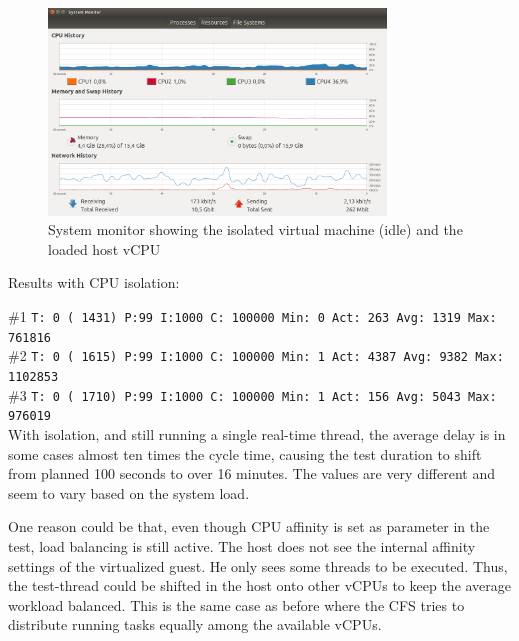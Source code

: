 \documentclass[]{scrartcl}
\begin{document}
\begin{figure}[t]
	\centering
	\includegraphics[width=0.8\textwidth]{test-cpu}
	\caption{System monitor showing the isolated virtual machine (idle) and the loaded host vCPU}
	\label{fig:test-cpu}
\end{figure}
\bigskip


\noindent Results with CPU isolation:

\noindent \small \#1 \texttt{T: 0 ( 1431) P:99 I:1000 C: 100000 Min: 0 Act:  263 Avg: 1319 Max:  761816}\\
\noindent \small \#2 \texttt{T: 0 ( 1615) P:99 I:1000 C: 100000 Min: 1 Act: 4387 Avg: 9382 Max: 1102853}\\
\noindent \small \#3 \texttt{T: 0 ( 1710) P:99 I:1000 C: 100000 Min: 1 Act:  156 Avg: 5043 Max:  976019}\\


With isolation, and still running a single real-time thread, the average delay is in some cases almost ten times the cycle time, causing the test duration to shift from planned 100 seconds to over 16 minutes. The values are very different and seem to vary based on the system load. 

One reason could be that, even though CPU affinity is set as parameter in the test, load balancing is still active. The host does not see the internal affinity settings of the virtualized guest. He only sees some threads to be executed.
Thus, the test-thread could be shifted in the host onto other vCPUs to keep the average workload balanced. This is the same case as before where the CFS tries to distribute running tasks equally among the available vCPUs.
\end{document}
